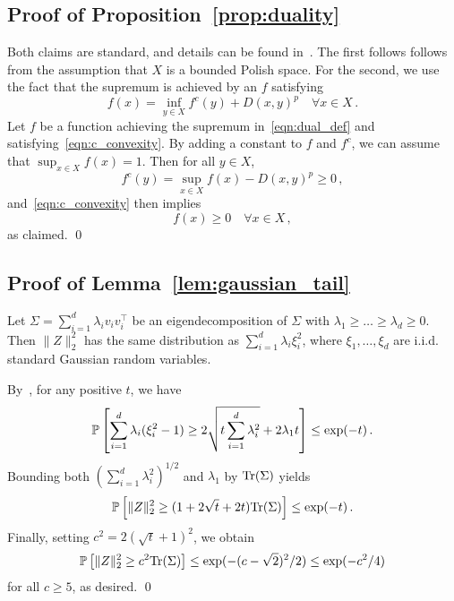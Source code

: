 \subsection{Proof of Proposition~\ref{prop:duality}}
Both claims are standard, and details can be found in~\cite[Theorem~5.10]{Vil09}.
The first follows follows from the assumption that $X$ is a bounded Polish space.
For the second, we use the fact that the supremum is achieved by an $f$ satisfying
\begin{equation}\label{eqn:c_convexity}
f(x) = \inf_{y \in X} f^c(y) + D(x, y)^p \quad \forall x \in X\,.
\end{equation}
Let $f$ be a function achieving the supremum in~\eqref{eqn:dual_def} and satisfying~\eqref{eqn:c_convexity}.
By adding a constant to $f$ and $f^c$, we can assume that $\sup_{x \in X} f(x) = 1$.
Then for all $y \in X$,
\begin{equation*}
f^c(y) = \sup_{x \in X} f(x) - D(x, y)^p \geq 0\,,
\end{equation*}
and~\eqref{eqn:c_convexity} then implies
\begin{equation*}
f(x) \geq 0 \quad \forall x \in X\,,
\end{equation*}
as claimed.
\qed

\subsection{Proof of Lemma~\ref{lem:gaussian_tail}}
Let $\Sigma = \sum_{i=1}^d \lambda_i v_i v_i^\top$ be an eigendecomposition of $\Sigma$ with $\lambda_1 \geq \dots \geq \lambda_d \geq 0$.
Then $\|Z\|_2^2$ has the same distribution as $\sum_{i=1}^d \lambda_i \xi_i^2$, where $\xi_1, \dots, \xi_d$ are i.i.d. standard Gaussian random variables. 

By~\cite[Lemma~1]{LauMas00}, for any positive $t$, we have
\begin{equation*}
\mathbb{P}\left[\sum_{i=1}^d \lambda_i (\xi_i^2-1) \geq 2 \sqrt{ t \sum_{i=1}^d \lambda_i^2} + 2 \lambda_{1} t\right] \leq \exp(-t)\,.
\end{equation*}
Bounding both $\left(\sum_{i=1}^d \lambda_i^2\right)^{1/2}$ and $\lambda_1$ by $\mathrm{Tr}(\Sigma)$ yields
\begin{equation*}
\mathbb{P}\left[\|Z\|_2^2 \geq (1 + 2\sqrt t + 2 t)\mathrm{Tr}(\Sigma)\right] \leq \exp(-t)\,.
\end{equation*}
Finally, setting $c^2 = 2(\sqrt t + 1)^2$, we obtain
\begin{equation*}
\mathbb{P}\left[\|Z\|_2^2 \geq c^2\mathrm{Tr}(\Sigma)\right] \leq \exp(-(c - \sqrt 2)^2/2) \leq \exp(-c^2/4)
\end{equation*}
for all $c \geq 5$, as desired.
\qed


